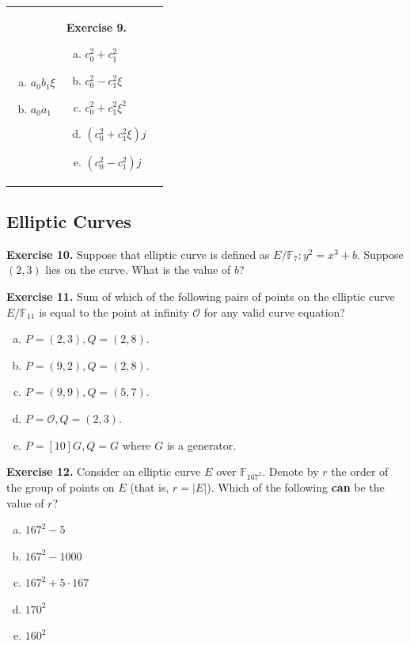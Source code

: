 \documentclass[../lecture-notes.tex]{subfiles}
\begin{document}
\begin{center}
\begin{tabular}{p{5cm}p{5cm}p{5cm}}
\begin{enumerate}[a)]
            \item $a_0b_1\xi$
            \item $a_0a_1$
        \end{enumerate} & 
        \textbf{Exercise 9.}
        \begin{enumerate}[a)]
            \item $c_0^2+c_1^2$
            \item $c_0^2-c_1^2\xi$
            \item $c_0^2+c_1^2\xi^2$
            \item $(c_0^2+c_1^2\xi)j$
            \item $(c_0^2-c_1^2)j$
        \end{enumerate} 
    \end{tabular}
\end{center}

\subsection*{Elliptic Curves}
\textbf{Exercise 10.} Suppose that elliptic curve is defined as $E/\mathbb{F}_{7}: y^2=x^3+b$. Suppose $(2,3)$ lies on the curve. What is the value of $b$?

\textbf{Exercise 11.} Sum of which of the following pairs of points on the elliptic curve $E/\mathbb{F}_{11}$ is equal to the point at infinity $\mathcal{O}$ for any valid curve equation?
\begin{enumerate}[a)]
    \item $P=(2,3),Q=(2,8)$.
    \item $P=(9,2),Q=(2,8)$.
    \item $P=(9,9),Q=(5,7)$.
    \item $P=\mathcal{O},Q=(2,3)$.
    \item $P=[10]G,Q=G$ where $G$ is a generator.
\end{enumerate}

\textbf{Exercise 12.} Consider an elliptic curve $E$ over $\mathbb{F}_{167^2}$. Denote by $r$ the order of the group of points on $E$ (that is, $r=|E|$). Which of the following \textbf{can} be the value of $r$?
\begin{enumerate}[a)]
    \item $167^2 - 5$
    \item $167^2-1000$
    \item $167^2+5 \cdot 167$
    \item $170^2$
    \item $160^2$
\end{enumerate}
\end{document}
